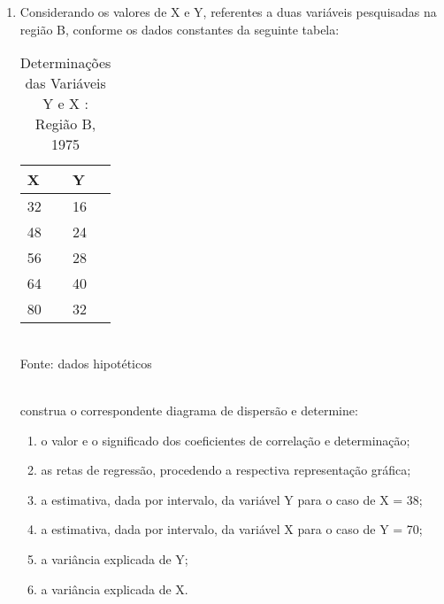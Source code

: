 \begin{enumerate}[resume]
\item Considerando os valores de X e Y, referentes a duas variáveis pesquisadas na região B, conforme os dados constantes da seguinte tabela:
	\begin{table}[!htb]
	\centering
	\caption{Determinações das Variáveis Y e X : Região B, 1975}
	\vspace{0.5cm}
	\begin{tabular}{ll}
	X & Y \\
	\hline 
	32 & 16  \\
	48 & 24  \\
	56 & 28  \\
	64 & 40  \\
	80 & 32  \\
	\end{tabular}\\
	Fonte: dados hipotéticos\\
	\end{table}\\	
	construa o correspondente diagrama de dispersão e determine:
	\begin{enumerate}
	\item o valor e o significado dos coeficientes de correlação e determinação;
	\item as retas de regressão, procedendo a respectiva representação gráfica;
	\item a estimativa, dada por intervalo, da variável Y para o caso de X = 38;
	\item	a estimativa, dada por intervalo, da variável X para o caso de Y = 70;
	\item a variância explicada de Y;	
	\item a variância explicada de X.
	\end{enumerate}
	

\end{enumerate}
